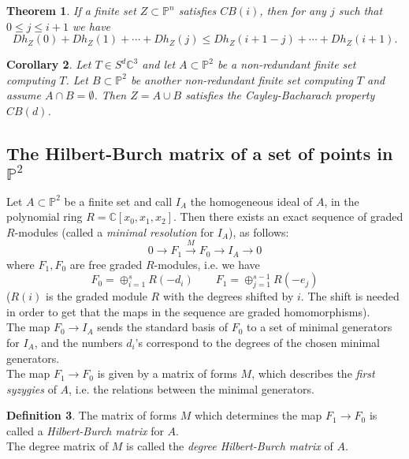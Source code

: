 \documentclass{amsart}
\newcommand{\C}{\mathbb{C}}
\newcommand{\Pj}{\mathbb{P}}
\newtheorem{thm0}{Theorem}[section]
\newtheorem{coro0}[thm0]{Corollary}
\theoremstyle{definition}
\newtheorem{defn0}[thm0]{Definition}
\begin{document}
\begin{thm0}\label{GKRext}
If a finite set $ Z \subset \Pj^{n} $ satisfies $\mathit{CB}(i)$, then for any $ j $ such that $ 0 \leq j \leq i+1 $ we have
$$ Dh_{Z}(0)+Dh_{Z}(1)+\cdots + Dh_{Z}(j) \leq Dh_{Z}(i+1-j)+\cdots +Dh_{Z}(i+1).$$
\end{thm0}


\begin{coro0}\label{CBconseq}
Let $ T \in S^{d}\C^{3} $ and let $ A \subset \Pj^{2} $ be a non-redundant finite set computing $ T $. 
Let $ B \subset \Pj^{2} $ be another non-redundant finite set computing $ T $
and assume $ A \cap B = \emptyset $. Then $Z=A\cup B$ satisfies the Cayley-Bacharach property $\mathit{CB}(d)$.
\end{coro0}

\subsection{The Hilbert-Burch matrix of a set of points in $\Pj^2$}\label{HBsec}

Let $A\subset \Pj^2$ be a finite set and call $I_A$ the homogeneous ideal of $A$, in the polynomial ring $R=\C[x_0,x_1,x_2]$. Then there exists 
an exact sequence of graded $R$-modules (called a \emph{minimal resolution} for $I_A$), as follows:
\begin{equation}
0 \longrightarrow F_1\xrightarrow M  F_0 \longrightarrow I_A \longrightarrow 0
\end{equation}
where $F_1,F_0$ are free graded $R$-modules, i.e. we have
$$   F_0 = \oplus_{i=1}^s R(-d_i)  \qquad  F_1 = \oplus_{j=1}^{s-1} R(-e_j)  $$
($R(i)$ is the graded module $R$ with the degrees shifted by $i$. The shift is needed in order to get that the maps in the
sequence are graded homomorphisms).\\
The map $F_0 \longrightarrow I_A $ sends the standard basis of $F_0$ to a set of minimal generators for $I_A$, and
the numbers $d_i$'s correspond to the degrees of the chosen minimal generators.\\
The map $F_1\longrightarrow  F_0$ is given by a matrix of forms $M$, which describes the \emph{first syzygies}
of $A$, i.e. the relations between the minimal generators.

\begin{defn0} \label{HBdef} The matrix of forms $M$ which determines the map $F_1\longrightarrow  F_0$ is called a \emph{Hilbert-Burch matrix}
for $A$. \\
The degree matrix of $M$ is called the  \emph{degree Hilbert-Burch matrix} of $A$.
\end{defn0}
\end{document}
